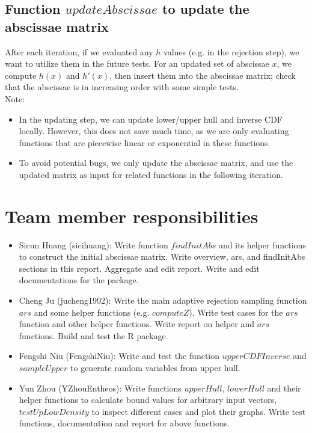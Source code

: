 \documentclass{article}\usepackage[]{graphicx}\usepackage[]{color}
\begin{document}
\subsection{Function $updateAbscissae$ to update the abscissae matrix}

After each iteration, if we evaluated any $h$ values (e.g. in the rejection step), we want to utilize them in the future tests. For an updated set of abscissae $x$, we compute $h(x)$ and $h'(x)$, then insert them into the abscissae matrix; check that the abscissae is in increasing order with some simple tests.
\\[12pt]
Note:
\begin{itemize}
\item In the updating step, we can update lower/upper hull and inverse CDF locally. However, this does not save much time, as we are only evaluating functions that are piecewise linear or exponential in these functions. 
\item To avoid potential bugs, we only update the abscissae matrix, and use the updated matrix as input for related functions in the following iteration.
\end{itemize}

\section{Team member responsibilities}

\begin{itemize}
\item Sicun Huang (sicihuang): Write function $findInitAbs$ and its helper functions to construct the initial abscissae matrix. Write overview, ars, and findInitAbs sections in this report. Aggregate and edit report. Write and edit documentations for the package.
\item Cheng Ju (jucheng1992): Write the main adaptive rejection sampling function $ars$ and some helper functions (e.g. $computeZ$). Write test cases for the $ars$ function and other helper functions. Write report on helper and $ars$ functions. Build and test the R package.
\item Fengshi Niu (FengshiNiu): Write and test the function $upperCDFInverse$ and $sampleUpper$ to generate random variables from upper hull. 
\item Yun Zhou (YZhouEntheos): Write functions $upperHull$, $lowerHull$ and their helper functions to calculate bound values for arbitrary input vectors, $testUpLowDensity$ to inspect different cases and plot their graphs. Write test functions, documentation and report for above functions. 


\end{itemize}
\end{document}

